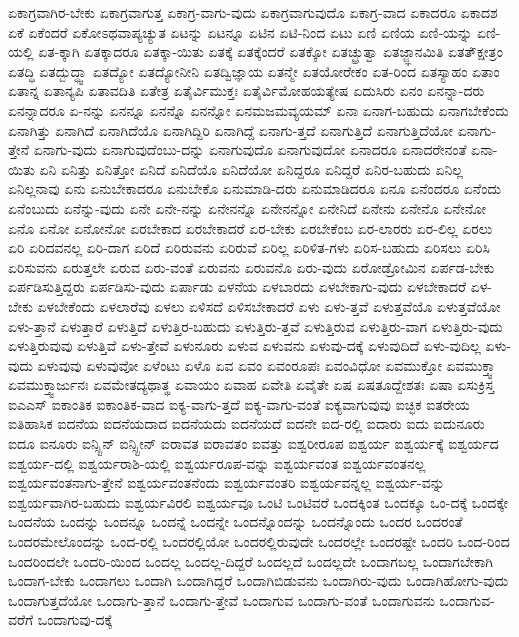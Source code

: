 {ಏಕಾಗ್ರವಾಗಿರ-ಬೇಕು
ಏಕಾಗ್ರವಾಗುತ್ತ
ಏಕಾಗ್ರ-ವಾಗು-ವುದು
ಏಕಾಗ್ರವಾಗುವುದೊ
ಏಕಾಗ್ರ-ವಾದ
ಏಕಾದರೂ
ಏಕಾದಶ
ಏಕೆ
ಏಕೆಂದರೆ
ಏಕೋಽಥವಾಪ್ಯಚ್ಯುತ
ಏಟನ್ನು
ಏಟನ್ನೂ
ಏಟಿನ
ಏಟಿ-ನಿಂದ
ಏಟು
ಏಣಿ
ಏಣಿಯ
ಏಣಿ-ಯನ್ನು
ಏಣಿ-ಯಲ್ಲಿ
ಏತ-ಕ್ಕಾಗಿ
ಏತಕ್ಕಾದರೂ
ಏತಕ್ಕಾ-ಯಿತು
ಏತಕ್ಕೆ
ಏತಕ್ಕೆಂದರೆ
ಏತಕ್ಕೋ
ಏತಚ್ಛ್ರುತ್ವಾ
ಏತಜ್ಜ್ಞಾನಮಿತಿ
ಏತತ್ಕ್ಷೇತ್ರಂ
ಏತದ್ಧಿ
ಏತದ್ಬುದ್ಧ್ವಾ
ಏತದ್ಯೋ
ಏತದ್ಯೋನೀನಿ
ಏತದ್ವಿಜ್ಞಾಯ
ಏತನ್ಮೇ
ಏತಯೋರೇಕಂ
ಏತ-ರಿಂದ
ಏತಸ್ಯಾಹಂ
ಏತಾಂ
ಏತಾನ್ನ
ಏತಾನ್ಯಪಿ
ಏತಾವದಿತಿ
ಏತೇತ್ರ
ಏತೈರ್ವಿಮುಕ್ತಃ
ಏತೈರ್ವಿಮೋಹಯತ್ಯೇಷ
ಏದುಸಿರು
ಏನಂ
ಏನನ್ನಾ-ದರು
ಏನನ್ನಾದರೂ
ಏ-ನನ್ನು
ಏನನ್ನೂ
ಏನನ್ನೊ
ಏನನ್ನೋ
ಏನಮಜಮವ್ಯಯಮ್
ಏನಾ
ಏನಾಗ-ಬಹುದು
ಏನಾಗಬೇಕೆಂದು
ಏನಾಗಿತ್ತು
ಏನಾಗಿದೆ
ಏನಾಗಿದೆಯೊ
ಏನಾಗಿದ್ದಿರಿ
ಏನಾಗಿದ್ದೆ
ಏನಾಗು-ತ್ತದೆ
ಏನಾಗುತ್ತಿದೆ
ಏನಾಗುತ್ತಿದೆಯೋ
ಏನಾಗು-ತ್ತೇನೆ
ಏನಾಗು-ವುದು
ಏನಾಗುವುದೆಂಬು-ದನ್ನು
ಏನಾಗುವುದೊ
ಏನಾಗುವುದೋ
ಏನಾದರೂ
ಏನಾದರೇನಂತೆ
ಏನಾ-ಯಿತು
ಏನಿ
ಏನಿತ್ತು
ಏನಿತ್ತೋ
ಏನಿದೆ
ಏನಿದೆಯೊ
ಏನಿದೆಯೋ
ಏನಿದ್ದರೂ
ಏನಿದ್ದರೆ
ಏನಿರ-ಬಹುದು
ಏನಿಲ್ಲ
ಏನಿಲ್ಲನಾವು
ಏನು
ಏನುಬೇಕಾದರೂ
ಏನುಬೇಕೊ
ಏನುಮಾಡಿ-ದರು
ಏನುಮಾಡಿದರೂ
ಏನೂ
ಏನೆಂದರೂ
ಏನೆಂದು
ಏನೆಂಬುದು
ಏನೆನ್ನು-ವುದು
ಏನೇ
ಏನೇ-ನನ್ನು
ಏನೇನನ್ನೊ
ಏನೇನನ್ನೋ
ಏನೇನಿದೆ
ಏನೇನು
ಏನೇನೊ
ಏನೇನೋ
ಏನೊ
ಏನೋ
ಏನೋನೋ
ಏರಬೇಕಾದ
ಏರಬೇಕಾದರೆ
ಏರ-ಬೇಕು
ಏರಬೇಕೆಂಬ
ಏರ-ಲಾರರು
ಏರ-ಲಿಲ್ಲ
ಏರಲು
ಏರಿ
ಏರಿದವನಲ್ಲ
ಏರಿ-ದಾಗ
ಏರಿದೆ
ಏರಿರುವನು
ಏರಿರುವೆ
ಏರಿಲ್ಲ
ಏರಿಳಿತ-ಗಳು
ಏರಿಸ-ಬಹುದು
ಏರಿಸಲು
ಏರಿಸಿ
ಏರಿಸುವನು
ಏರುತ್ತಲೇ
ಏರುವ
ಏರು-ವಂತೆ
ಏರುವನು
ಏರುವನೊ
ಏರು-ವುದು
ಏರೋಡ್ರೋಮಿನ
ಏರ್ಪಡ-ಬೇಕು
ಏರ್ಪಡಿಸುತ್ತಿದ್ದರು
ಏರ್ಪಡಿಸು-ವುದು
ಏರ್ಪಾಡು
ಏಳನೆಯ
ಏಳಬಾರದು
ಏಳಬೇಕಾಗು-ವುದು
ಏಳಬೇಕಾದರೆ
ಏಳ-ಬೇಕು
ಏಳಬೇಕೆಂದು
ಏಳಲಾರೆವು
ಏಳಲು
ಏಳಿಸದೆ
ಏಳಿಸಬೇಕಾದರೆ
ಏಳು
ಏಳು-ತ್ತವೆ
ಏಳುತ್ತವೆಯೊ
ಏಳುತ್ತವೆಯೋ
ಏಳು-ತ್ತಾನೆ
ಏಳುತ್ತಾರೆ
ಏಳುತ್ತಿದೆ
ಏಳುತ್ತಿರ-ಬಹುದು
ಏಳುತ್ತಿರು-ತ್ತವೆ
ಏಳುತ್ತಿರುವ
ಏಳುತ್ತಿರು-ವಾಗ
ಏಳುತ್ತಿರು-ವುದು
ಏಳುತ್ತಿರುವುವು
ಏಳುತ್ತಿವೆ
ಏಳು-ತ್ತೇವೆ
ಏಳುನೂರು
ಏಳುವ
ಏಳುವನು
ಏಳುವು-ದಕ್ಕೆ
ಏಳುವುದಿದೆ
ಏಳು-ವುದಿಲ್ಲ
ಏಳು-ವುದು
ಏಳುವುವು
ಏಳುವುವೋ
ಏಳೆಂಟು
ಏಳೊ
ಏವ
ಏವಂ
ಏವಂರೂಪಃ
ಏವಂವಿಧೋ
ಏವಮುಕ್ತೋ
ಏವಮುಕ್ತ್ವಾ
ಏವಮುಕ್ತ್ವಾರ್ಜುನಃ
ಏವಮೇತದ್ಯಥಾತ್ಥ
ಏವಾಯಂ
ಏವಾಹ
ಏವೇತಿ
ಏವೈತೇ
ಏಷ
ಏಷತೂದ್ದೇಶತಃ
ಏಷಾ
ಏಸುಕ್ರಿಸ್ತ
ಐಎಎಸ್
ಐಕಾಂತಿಕ
ಐಕಾಂತಿಕ-ವಾದ
ಐಕ್ಯ-ವಾಗು-ತ್ತದೆ
ಐಕ್ಯ-ವಾಗು-ವಂತೆ
ಐಕ್ಯವಾಗುವುವು
ಐಚ್ಛಿಕ
ಐತರೇಯ
ಐತಿಹಾಸಿಕ
ಐದನೆಯ
ಐದನೆಯದಾದ
ಐದನೆಯದು
ಐದನೆಯದೆ
ಐದನೇ
ಐದ-ರಲ್ಲಿ
ಐದಾರು
ಐದು
ಐದುನೂರು
ಐದೂ
ಐನೂರು
ಐನ್ಸ್ಟಿನ್
ಐನ್ಸ್ಟೀನ್
ಐರಾವತ
ಐರಾವತಂ
ಐವತ್ತು
ಐಶ್ವರೀರೂಪ
ಐಶ್ವರ್ಯ
ಐಶ್ವರ್ಯಕ್ಕೆ
ಐಶ್ವರ್ಯದ
ಐಶ್ವರ್ಯ-ದಲ್ಲಿ
ಐಶ್ವರ್ಯರಾಶಿ-ಯಲ್ಲಿ
ಐಶ್ವರ್ಯರೂಪ-ವನ್ನು
ಐಶ್ವರ್ಯವಂತ
ಐಶ್ವರ್ಯವಂತನಲ್ಲ
ಐಶ್ವರ್ಯವಂತನಾಗು-ತ್ತೇನೆ
ಐಶ್ವರ್ಯವಂತನೆಂದು
ಐಶ್ವರ್ಯವಂತರಿ
ಐಶ್ವರ್ಯವನ್ನಲ್ಲ
ಐಶ್ವರ್ಯ-ವನ್ನು
ಐಶ್ವರ್ಯವಾಗಿರ-ಬಹುದು
ಐಶ್ವರ್ಯವಿರಲಿ
ಐಶ್ವರ್ಯವೂ
ಒಂಟಿ
ಒಂಟಿವರೆ
ಒಂದಕ್ಕಿಂತ
ಒಂದಕ್ಕೂ
ಒಂ-ದಕ್ಕೆ
ಒಂದಕ್ಕೇ
ಒಂದನೆಯ
ಒಂದನ್ನು
ಒಂದನ್ನೂ
ಒಂದನ್ನೆ
ಒಂದನ್ನೇ
ಒಂದನ್ನೊಂದನ್ನು
ಒಂದನ್ನೊಂದು
ಒಂದರ
ಒಂದರಂತೆ
ಒಂದರಮೇಲೊಂದನ್ನು
ಒಂದ-ರಲ್ಲಿ
ಒಂದರಲ್ಲಿಯೋ
ಒಂದರಲ್ಲಿರುವುದೇ
ಒಂದರಲ್ಲೇ
ಒಂದರಷ್ಟೇ
ಒಂದರಿ
ಒಂದ-ರಿಂದ
ಒಂದರಿಂದಲೇ
ಒಂದರಿ-ಯಿಂದ
ಒಂದಲ್ಲ
ಒಂದಲ್ಲ-ದಿದ್ದರೆ
ಒಂದಲ್ಲದೆ
ಒಂದಲ್ಲದೇ
ಒಂದಾಗಬಲ್ಲ
ಒಂದಾಗಬೇಕಾಗಿ
ಒಂದಾಗ-ಬೇಕು
ಒಂದಾಗಲು
ಒಂದಾಗಿ
ಒಂದಾಗಿದ್ದರೆ
ಒಂದಾಗಿಬಿಡುವನು
ಒಂದಾಗಿರು-ವುದು
ಒಂದಾಗಿಹೋಗು-ವುದು
ಒಂದಾಗುತ್ತದೆಯೋ
ಒಂದಾಗು-ತ್ತಾನೆ
ಒಂದಾಗು-ತ್ತೇವೆ
ಒಂದಾಗುವ
ಒಂದಾಗು-ವಂತೆ
ಒಂದಾಗುವನು
ಒಂದಾಗುವ-ವರೆಗೆ
ಒಂದಾಗುವು-ದಕ್ಕೆ
}
